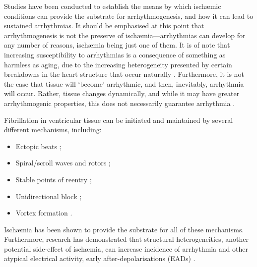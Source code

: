 \documentclass[../thesis-main.tex]{subfiles}
\begin{document}
Studies have been conducted to establish the means by which isch\ae{}mic conditions can provide the substrate for arrhythmogenesis, and how it can lead to sustained arrhythmias. It should be emphasised at this point that arrhythmogenesis is not the preserve of isch\ae{}mia---arrhythmias can develop for any number of reasons, isch\ae{}mia being just one of them. It is of note that increasing susceptibility to arrhythmias is a consequence of something as harmless as aging, due to the increasing heterogeneity presented by certain breakdowns in the heart structure that occur naturally \citep{Spach1988}. Furthermore, it is not the case that tissue will `become' arrhythmic, and then, inevitably, arrhythmia will occur. Rather, tissue changes dynamically, and while it may have greater arrhythmogenic properties, this does not necessarily guarantee arrhythmia \citep{Weiss2006}.

Fibrillation in ventricular tissue can be initiated and maintained by several different mechanisms, including:
\begin{itemize}
 \item Ectopic beats \citep{Haissaguerre1998, Tobon2010, Zhang2011};
 \item Spiral/scroll waves and rotors \citep{Jalife2003, Jalife2009, Pandit2013};
 \item Stable points of reentry \citep{Mandapati2000, Allessie1977};
 \item Unidirectional block \citep{Allessie1976, Gough1985};
 \item Vortex formation \citep{Cabo1996}.
\end{itemize}
Isch\ae{}mia has been shown to provide the substrate for all of these mechanisms. Furthermore, research has demonstrated that structural heterogeneities, another potential side-effect of isch\ae{}mia, can increase incidence of arrhythmia and other atypical electrical activity, \eg{} early after-depolarisations (EADs) \citep{Auerbach2011}.
\end{document}
